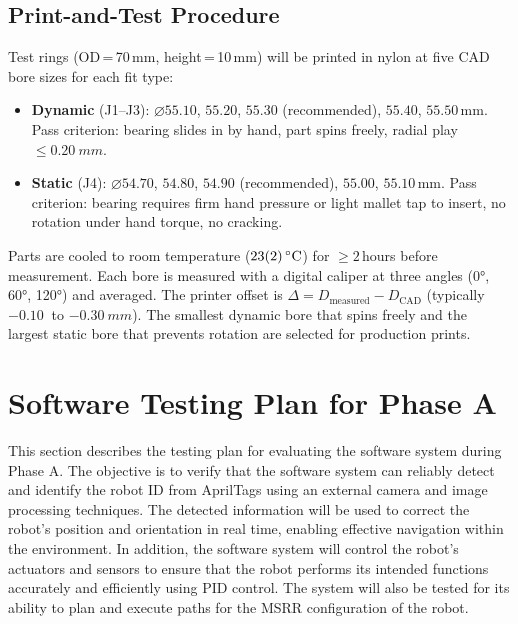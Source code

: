 \documentclass[12pt,a4paper]{article}
\begin{document}
\subsection{Print-and-Test Procedure}

Test rings (OD\,=\,70\,mm, height\,=\,10\,mm) will be printed in nylon at five
CAD bore sizes for each fit type:

\begin{itemize}[nosep]
  \item \textbf{Dynamic} (J1--J3): $\varnothing 55.10$, $55.20$,
        $\mathbf{55.30}$ (recommended), $55.40$, $55.50$\,mm.
        Pass criterion: bearing slides in by hand, part spins freely, radial
        play $\leq \SI{0.20}{mm}$.
  \item \textbf{Static} (J4): $\varnothing 54.70$, $54.80$,
        $\mathbf{54.90}$ (recommended), $55.00$, $55.10$\,mm.
        Pass criterion: bearing requires firm hand pressure or light mallet tap
        to insert, no rotation under hand torque, no cracking.
\end{itemize}

Parts are cooled to room temperature ($\SI{23 \pm 2}{\degreeCelsius}$) for
$\geq 2$\,hours before measurement.  Each bore is measured with a digital
caliper at three angles (\ang{0}, \ang{60}, \ang{120}) and averaged.  The
printer offset is $\Delta = D_{\text{measured}} - D_{\text{CAD}}$ (typically
$\SI{-0.10}{}$ to $\SI{-0.30}{mm}$).  The smallest dynamic bore that spins
freely and the largest static bore that prevents rotation are selected for
production prints.

\section{Software Testing Plan for Phase A}
\label{sec:software-testing}
This section describes the testing plan for evaluating the software system during Phase A. The objective is to verify that the software system can reliably detect and identify the robot ID from AprilTags using an external camera and image processing techniques. The detected information will be used to correct the robot's position and orientation in real time, enabling effective navigation within the environment. In addition, the software system will control the robot's actuators and sensors to ensure that the robot performs its intended functions accurately and efficiently using PID control. The system will also be tested for its ability to plan and execute paths for the MSRR configuration of the robot.
\end{document}
